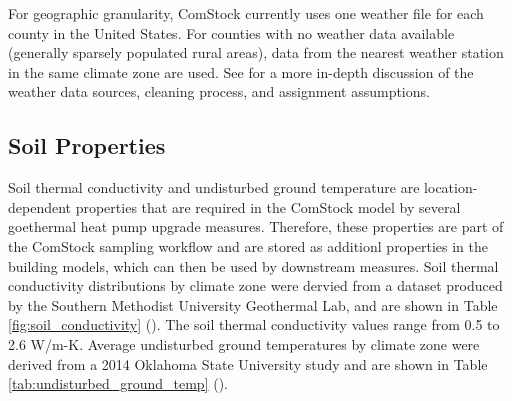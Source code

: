 For geographic granularity, ComStock currently uses one weather file for each county in the United States. For counties with no weather data available (generally sparsely populated rural areas), data from the nearest weather station in the same climate zone are used. See \citep{eulp_final_report} for a more in-depth discussion of the weather data sources, cleaning process, and assignment assumptions.

\subsection{Soil Properties}
Soil thermal conductivity and undisturbed ground temperature are location-dependent properties that are required in the ComStock model by several goethermal heat pump upgrade measures. Therefore, these properties are part of the ComStock sampling workflow and are stored as additionl properties in the building models, which can then be used by downstream measures. Soil thermal conductivity distributions by climate zone were dervied from a dataset produced by the Southern Methodist University Geothermal Lab, and are shown in Table \ref{fig:soil_conductivity} (\cite{smu_soil_conductivity}). The soil thermal conductivity values range from 0.5 to 2.6 W/m-K. Average undisturbed ground temperatures by climate zone were derived from a 2014 Oklahoma State University study and are shown in Table \ref{tab:undisturbed_ground_temp} (\cite{xing2014}).